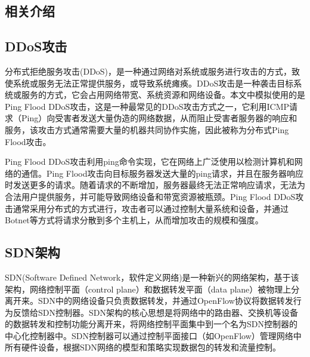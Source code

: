 \begin{multicols}{2}
%
\section{相关介绍}
\subsection{DDoS攻击}
分布式拒绝服务攻击(DDoS)，是一种通过网络对系统或服务进行攻击的方式，致使系统或服务无法正常提供服务，或导致系统瘫痪。DDoS攻击是一种袭击目标系统或服务的方式，它会占用网络带宽、系统资源和网络设备。本文中模拟使用的是Ping Flood DDoS攻击，这是一种最常见的DDoS攻击方式之一，它利用ICMP请求（Ping）向受害者发送大量伪造的网络数据，从而阻止受害者服务器的响应和服务，该攻击方式通常需要大量的机器共同协作实施，因此被称为分布式Ping Flood攻击。

Ping Flood DDoS攻击利用ping命令实现，它在网络上广泛使用以检测计算机和网络的通信。Ping Flood攻击向目标服务器发送大量的ping请求，并且在服务器响应时发送更多的请求。随着请求的不断增加，服务器最终无法正常响应请求，无法为合法用户提供服务，并可能导致网络设备和带宽资源被瓶颈。Ping Flood DDoS攻击通常采用分布式的方式进行，攻击者可以通过控制大量系统和设备，并通过Botnet等方式将请求分散到多个主机上，从而增加攻击的规模和强度。
\subsection{SDN架构}
SDN(Software Defined Network，软件定义网络)是一种新兴的网络架构，基于该架构，网络控制平面（control plane）和数据转发平面（data plane）被物理上分离开来。SDN中的网络设备只负责数据转发，并通过OpenFlow协议将数据转发行为反馈给SDN控制器。SDN架构的核心思想是将网络中的路由器、交换机等设备的数据转发和控制功能分离开来，将网络控制平面集中到一个名为SDN控制器的中心化控制器中。SDN控制器可以通过控制平面接口（如OpenFlow）管理网络中所有硬件设备，根据SDN网络的模型和策略实现数据包的转发和流量控制。


\end{multicols}
